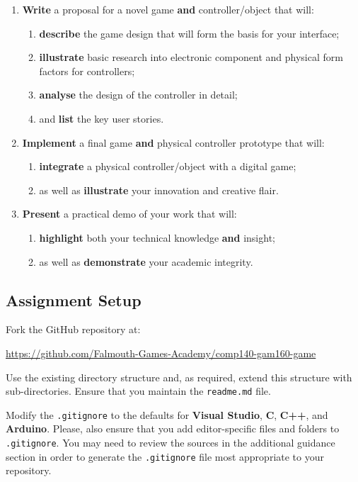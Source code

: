 \documentclass{../../fal_assignment}
\begin{document}
\begin{enumerate}[label=(\Alph*)]
    \item \textbf{Write} a proposal for a novel game \textbf{and} controller/object that will:
    	\begin{enumerate}[label=\roman*.]
    		\item \textbf{describe} the game design that will form the basis for your interface;
    		\item \textbf{illustrate} basic  research into electronic component and physical form factors for controllers;
		\item \textbf{analyse} the design of the controller in detail;
		\item and \textbf{list} the key user stories.
	\end{enumerate}
    \item \textbf{Implement} a final game \textbf{and} physical controller prototype that will:
    	\begin{enumerate}[label=\roman*.]
    		\item \textbf{integrate} a physical controller/object with a digital game;
		\item as well as \textbf{illustrate} your innovation and creative flair.
	\end{enumerate}
    \item \textbf{Present} a practical demo of your work that will:
    	\begin{enumerate}[label=\roman*.]
    		\item \textbf{highlight} both your technical knowledge \textbf{and} insight;
    		\item as well as \textbf{demonstrate} your academic integrity.
	\end{enumerate}
\end{enumerate}

	\subsection*{Assignment Setup}
	
	Fork the GitHub repository at:
	
	\indent \url{https://github.com/Falmouth-Games-Academy/comp140-gam160-game}
	
	Use the existing directory structure and, as required, extend this structure with sub-directories. Ensure that you maintain the \texttt{readme.md} file.
	
	Modify the \texttt{.gitignore} to the defaults for \textbf{Visual Studio}, \textbf{C}, \textbf{C++}, and \textbf{Arduino}. Please, also ensure that you add editor-specific files and folders to \texttt{.gitignore}. You may need to review the sources in the additional guidance section in order to generate the \texttt{.gitignore} file most appropriate to your repository. 
\end{document}
